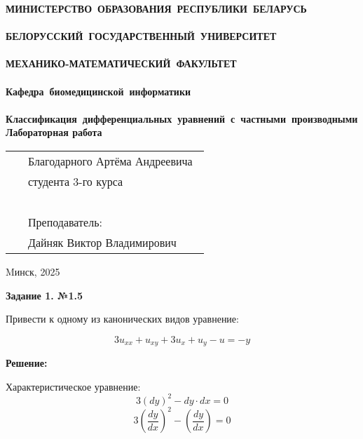 \documentclass[a4paper,12pt]{article}
\begin{document}
\setcounter{page}{1}
\thispagestyle{empty}
\begin{center}
\bf
\vspace{4cm}
{
\mbox{МИНИСТЕРСТВО~ОБРАЗОВАНИЯ~РЕСПУБЛИКИ~БЕЛАРУСЬ} \\~\\
\mbox{БЕЛОРУССКИЙ~ГОСУДАРСТВЕННЫЙ~УНИВЕРСИТЕТ} \\~\\
\mbox{МЕХАНИКО-МАТЕМАТИЧЕСКИЙ~ФАКУЛЬТЕТ} \\~\\
\mbox{Кафедра~биомедицинской~информатики} \\~\\
}
\vspace{4cm}
\bf
\mbox{Классификация дифференциальных уравнений с частными производными}\\
\vspace{1cm}
\rm Лабораторная работа 
\vspace{3cm}
\end{center}
\begin{tabular}{ll}
\hspace{10.5cm}
&Благодарного Артёма Андреевича~\\
&студента 3-го курса\\~\\
&Преподаватель:\\
&Дайняк Виктор Владимирович
\end{tabular}
\vspace{7cm}
\begin{center}
Mинск, 2025
\end{center}
\clearpage
\restoregeometry

\begin{center}    
\noindent \textbf{Задание 1. №1.5}
\end{center}

Привести к одному из канонических видов уравнение:

\begin{equation*}
    3u_{xx} + u_{xy} + 3u_{x} + u_{y} - u = -y
\end{equation*}

\textbf{Решение:}

Характеристическое уравнение:
\begin{equation*}
    3 (dy)^2 - dy \cdot dx = 0
\end{equation*}
\begin{equation*}
   3 \left( \frac{dy}{dx} \right)^2 - \left( \frac{dy}{dx} \right) = 0
\end{equation*}
\end{document}
